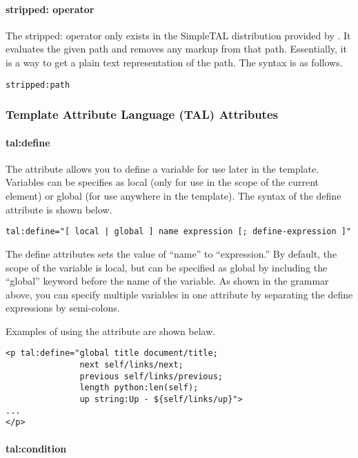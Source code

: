\paragraph{stripped: operator}

The stripped: operator only exists in the SimpleTAL distribution provided
by \plasTeX.  It evaluates the given path and removes any markup from
that path.  Essentially, it is a way to get a plain text representation
of the path.  The syntax is as follows.
\begin{verbatim}
stripped:path
\end{verbatim}


\subsubsection{Template Attribute Language (TAL) Attributes\label{sec:talattributes}}

\paragraph{tal:define}

The  attribute allows you to define a variable for use
later in the template.  Variables can be specifies as local (only for
use in the scope of the current element) or global (for use anywhere in
the template).  The syntax of the define attribute is shown below.
\begin{verbatim}
tal:define="[ local | global ] name expression [; define-expression ]"
\end{verbatim}

The define attributes sets the value of ``name'' to ``expression.''  
By default, the scope of the variable is local, but can be specified
as global by including the ``global'' keyword before the name of the 
variable.  As shown in the grammar above, you can specify multiple 
variables in one  attribute by separating the define
expressions by semi-colons.

Examples of using the  attribute are shown belaw.
\begin{verbatim}
<p tal:define="global title document/title; 
               next self/links/next;
               previous self/links/previous;
               length python:len(self);
               up string:Up - ${self/links/up}">
...
</p>
\end{verbatim}


\paragraph{tal:condition}

